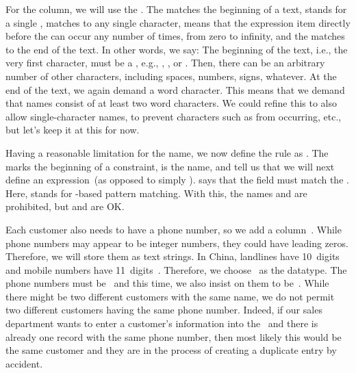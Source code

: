 For the  column, we will use the  .
The \textil{^} matches the beginning of a text, \textil{\\w} stands for a single ,  matches to any single character, \textil{*} means that the expression item directly before the \textil{*} can occur any number of times, from zero to infinity, and the \textil{\$} matches to the end of the text.
In other words, we say:
The beginning of the text, i.e., the very first character, must be a , e.g., , , or .
Then, there can be an arbitrary number of other characters, including spaces, numbers, signs, whatever.
At the end of the text, we again demand a word character.
This means that we demand that names consist of at least two word characters.
We could refine this to also allow single-character names, to prevent characters such as  from occurring, etc., but let's keep it at this for now.%
%
\begin{sloppypar}%
Having a reasonable limitation for the name, we now define the rule  as \sqlIdx{\$}\sqlIdx{\textasciicircum}\sqlIdx{\textasciitilde}.
The  marks the beginning of a constraint,  is the name, and  tell us that we will next define an expression~(as opposed to simply ).
\sqlIdx{\$}\sqlIdx{\textasciicircum}\sqlIdx{\textasciitilde} says that the field  must match the  .
Here, \sqlil{\~}\sqlIdx{\textasciitilde} stands for -based pattern matching.
With this, the names  and  are prohibited, but  and  are OK.%
\end{sloppypar}%
%
Each customer also needs to have a phone number, so we add a column~.
While phone numbers may appear to be integer numbers, they could have leading zeros.
Therefore, we will store them as text strings.
In China, landlines have 10~digits and mobile numbers have 11~digits~\cite{BD2006BDBK:MPNANSBTTMDFMP}.
Therefore, we choose~ as the datatype.
The phone numbers must be~ and this time, we also insist on them to be~.
While there might be two different customers with the same name, we do not permit two different customers having the same phone number.
Indeed, if our sales department wants to enter a customer's information into the \db\ and there is already one record with the same phone number, then most likely this would be the same customer and they are in the process of creating a duplicate entry by accident.

